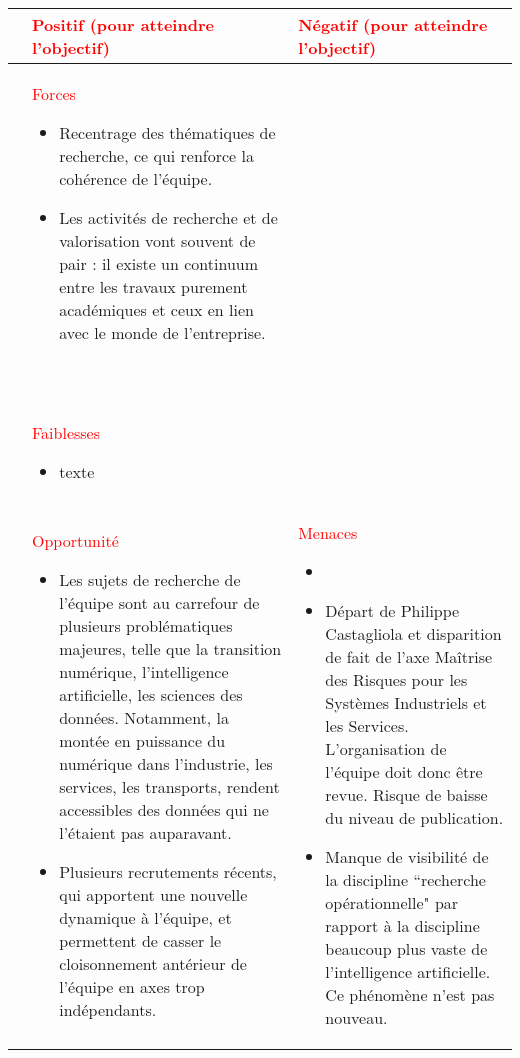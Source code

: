 			\begin{table}[H]
			\begin{tabularx}{\textwidth}{|>{\centering\arraybackslash}l|>{\centering\arraybackslash}X|>{\centering\arraybackslash}X|}
			\hline
			&\textcolor{red}{Positif (pour atteindre l'objectif)} & \textcolor{red}{Négatif (pour atteindre l'objectif)}\\
			\hline
			\color{red}\parbox[t]{2mm}{} & \centering\textcolor{red}{Forces} 
			\smallskip
			\begin{itemize}
			\item  Recentrage des thématiques de recherche, ce qui renforce la cohérence de l'équipe.
			\item Les activités de recherche et de valorisation vont souvent de pair : il existe un continuum entre les travaux purement académiques et ceux en lien avec le monde de l'entreprise. 
			
			\end{itemize} ~\\ & \textcolor{red}{Faiblesses}
			\smallskip
			\begin{itemize}
			
			\item  texte
			\end{itemize}\\
			\hline
			\centering\color{red}\parbox[t]{2mm}{} & \centering\textcolor{red}{Opportunité} 
			\smallskip
			\begin{itemize} 
			\item  Les sujets de recherche de l'équipe sont au carrefour de plusieurs problématiques majeures, telle que la transition numérique, l'intelligence artificielle, les sciences des données. Notamment, la montée en puissance du numérique dans l'industrie, les services, les transports, rendent accessibles des données qui ne l'étaient pas auparavant. 
			\item  Plusieurs recrutements récents, qui apportent une nouvelle dynamique à l'équipe, et permettent de casser le cloisonnement antérieur de l'équipe en axes trop indépendants.
			\end{itemize} & \textcolor{red}{Menaces}
			\smallskip
			\begin{itemize} 
			\item 
			\item  Départ de Philippe Castagliola et disparition de fait de l'axe Maîtrise des Risques pour les Systèmes Industriels et les Services. L'organisation de l'équipe doit donc être revue. Risque de baisse du niveau de publication. 
			\item Manque de visibilité de la discipline ``recherche opérationnelle" par rapport à la discipline beaucoup plus vaste 
			de l'intelligence artificielle. Ce phénomène n'est pas nouveau. 
			\end{itemize}\\
			\hline
			\end{tabularx}
			\end{table}
		 

